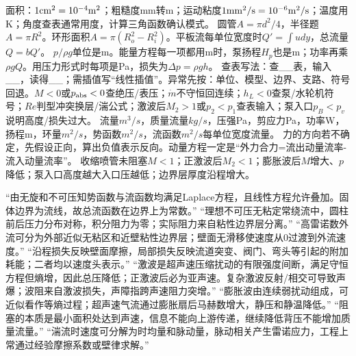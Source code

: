 面积：$1{\rm cm^2}=10^{-4}{\rm m^2}$；粗糙度mm转m；运动粘度$1{\rm mm^2/s}=10^{-6}{\rm m^2/s}$；温度用K；角度查表通常用度，计算三角函数确认模式。
圆管$A=\pi d^2/4$，半径题$A=\pi R^2$。环形面积$A=\pi(R_o^2-R_i^2)$。平板流每单位宽度时$Q'=\int udy$，总流量$Q=bQ'$。
$p/\rho g$单位是m。能量方程每一项都用m时，泵扬程$H_p$也是m；功率再乘$\rho gQ$。用压力形式时每项是Pa，损失为$\Delta p=\rho gh$。
查表写法：查\_\_表，输入\_\_，读得\_\_；需插值写“线性插值”。异常先按：单位、模型、边界、支路、符号回退。$M<0$或$p_{\rm abs}<0$查绝压/表压；$\dot m$不守恒回连续；$h_L<0$查泵/水轮机符号；$Re$判型冲突换层/湍公式；激波后$M_2>1$或$p_2<p_1$查表输入；泵入口$p_B<p_v$说明高度/损失过大。
流量$m^3/s$，质量流量$kg/s$，压强Pa，剪应力Pa，功率W，扬程m，环量$m^2/s$，势函数$m^2/s$，流函数$m^2/s$每单位宽度流量。
力的方向若不确定，先假设正向，算出负值表示反向。动量方程一定是“外力合力=流出动量流率-流入动量流率”。
收缩喷管未阻塞$M<1$；正激波后$M_2<1$；膨胀波后$M$增大、$p$降低；泵入口高度越大入口压越低；边界层厚度沿程增大。

“由无旋和不可压知势函数与流函数均满足Laplace方程，且线性方程允许叠加。固体边界为流线，故总流函数在边界上为常数。”
“理想不可压无粘定常绕流中，圆柱前后压力分布对称，积分阻力为零；实际阻力来自粘性边界层分离。”
“高雷诺数外流可分为外部近似无粘区和近壁粘性边界层；壁面无滑移使速度从0过渡到外流速度。”
“沿程损失反映壁面摩擦，局部损失反映流道突变、阀门、弯头等引起的附加耗能；二者均以速度头表示。”
“激波是超声速压缩扰动的有限强度间断，满足守恒方程但熵增，因此总压降低；正激波后必为亚声速。复杂激波反射/相交可导致声爆；波阻来自激波损失，声障指跨声速阻力突增。”
“膨胀波由连续弱扰动组成，可近似看作等熵过程；超声速气流通过膨胀扇后马赫数增大，静压和静温降低。”
“阻塞的本质是最小面积处达到声速，信息不能向上游传递，继续降低背压不能增加质量流量。”
“湍流时速度可分解为时均量和脉动量，脉动相关产生雷诺应力，工程上常通过经验摩擦系数或壁律求解。”

